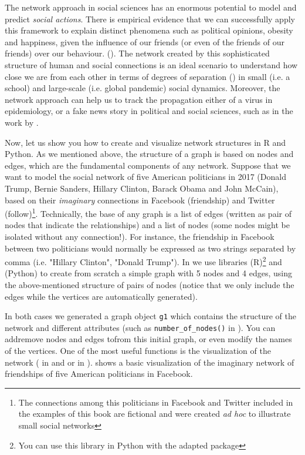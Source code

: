 The network approach in social sciences has an enormous potential to model and predict \textit{social actions}. There is empirical evidence that we can successfully apply this framework to explain distinct phenomena such as political opinions, obesity and happiness, given the influence of our friends (or even of the friends of our friends) over our behaviour. (\cite{christakis2009connected}). The network created by this sophisticated structure of human and social connections is an ideal scenario to understand how close we are from each other in terms of degrees of separation (\cite{watts2004six}) in small (i.e. a school) and large-scale (i.e. global pandemic) social dynamics. Moreover, the network approach can help us to track the propagation either of a virus in epidemiology, or a fake news story in political and social sciences, such as in the work by 
\citet{vosoughi2018spread}. 

Now, let us show you how to create and visualize network structures in R and Python. As we mentioned above, the structure of a graph is based on nodes and edges, which are the fundamental components of any network. Suppose that we want to model the social network of five American politicians in 2017 (Donald Trump, Bernie Sanders, Hillary Clinton, Barack Obama and John McCain), based on their \textit{imaginary} connections in Facebook (friendship) and Twitter (follow)\footnote{The connections among this politicians in Facebook and Twitter included in the examples of this book are fictional and were created \textit{ad hoc} to illustrate small social networks}. Technically, the base of any graph is a list of edges (written as pair of nodes that indicate the relationships) and a list of nodes (some nodes might be isolated without any connection!).  For instance, the friendship in Facebook between two politicians would normally be expressed as two strings separated by comma (i.e. "Hillary Clinton", "Donald Trump"). In  we use libraries  (R)\footnote{You can use this library in Python with the adapted package } and  (Python) to create from scratch a simple graph with 5 nodes and 4 edges, using the above-mentioned structure of pairs of nodes (notice that we only include the edges while the vertices are automatically generated).


In both cases we generated a graph object \texttt{g1} which contains the structure of the network and different attributes (such as \verb|number_of_nodes()| in ). You can add\/remove nodes and edges to\/from this initial graph, or even modify the names of the vertices. One of the most useful functions is the visualization of the network ( in  and  or  in ).  shows a basic visualization of the imaginary network of friendships of five American politicians in Facebook.

